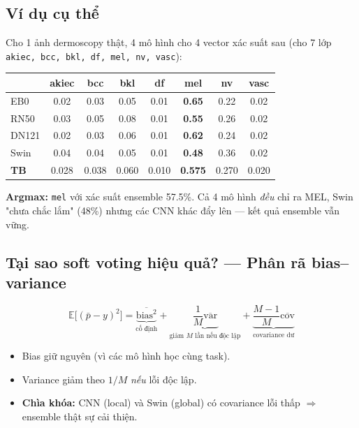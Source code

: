 \documentclass[11pt,a4paper]{article}
\begin{document}
\subsection{Ví dụ cụ thể}

\begin{example}
Cho 1 ảnh dermoscopy thật, 4 mô hình cho 4 vector xác suất sau (cho 7 lớp \texttt{akiec, bcc, bkl, df, mel, nv, vasc}):

\small
\begin{tabular}{lccccccc}
\toprule
& akiec & bcc & bkl & df & \textbf{mel} & nv & vasc \\
\midrule
EB0    & 0.02 & 0.03 & 0.05 & 0.01 & \textbf{0.65} & 0.22 & 0.02 \\
RN50   & 0.03 & 0.05 & 0.08 & 0.01 & \textbf{0.55} & 0.26 & 0.02 \\
DN121  & 0.02 & 0.03 & 0.06 & 0.01 & \textbf{0.62} & 0.24 & 0.02 \\
Swin   & 0.04 & 0.04 & 0.05 & 0.01 & \textbf{0.48} & 0.36 & 0.02 \\
\midrule
\textbf{TB} & 0.028 & 0.038 & 0.060 & 0.010 & \textbf{0.575} & 0.270 & 0.020 \\
\bottomrule
\end{tabular}
\normalsize

\textbf{Argmax:} \texttt{mel} với xác suất ensemble 57.5\%. Cả 4 mô hình \textit{đều} chỉ ra MEL, Swin "chưa chắc lắm" (48\%) nhưng các CNN khác đẩy lên --- kết quả ensemble vẫn vững.
\end{example}

\subsection{Tại sao soft voting hiệu quả? --- Phân rã bias--variance}

\[
  \mathbb{E}\bigl[(\bar{p} - y)^2\bigr] = \underbrace{\overline{\mathrm{bias}^2}}_{\text{cố định}} + \underbrace{\frac{1}{M}\overline{\mathrm{var}}}_{\text{giảm }M\text{ lần nếu độc lập}} + \underbrace{\frac{M-1}{M}\overline{\mathrm{cov}}}_{\text{covariance dư}}
\]

\begin{itemize}[leftmargin=*]
  \item Bias giữ nguyên (vì các mô hình học cùng task).
  \item Variance giảm theo $1/M$ \textit{nếu} lỗi độc lập.
  \item \textbf{Chìa khóa:} CNN (local) và Swin (global) có covariance lỗi thấp $\Rightarrow$ ensemble thật sự cải thiện.
\end{itemize}
\end{document}
